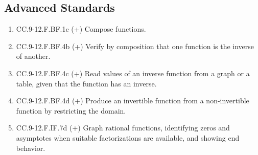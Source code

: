 \documentclass{article}
\begin{document}
\subsection*{Advanced Standards}
\begin{enumerate}
	\item CC.9-12.F.BF.1c (+) Compose functions. 
	\item CC.9-12.F.BF.4b (+) Verify by composition that one function is the inverse of another. 
	\item CC.9-12.F.BF.4c (+) Read values of an inverse function from a graph or a table, given that the function has an inverse.
	\item CC.9-12.F.BF.4d (+) Produce an invertible function from a non-invertible function by restricting the domain.
	\item CC.9-12.F.IF.7d (+) Graph rational functions, identifying zeros and asymptotes when suitable factorizations are available, and showing end behavior. 
\end{enumerate}
\end{document}
